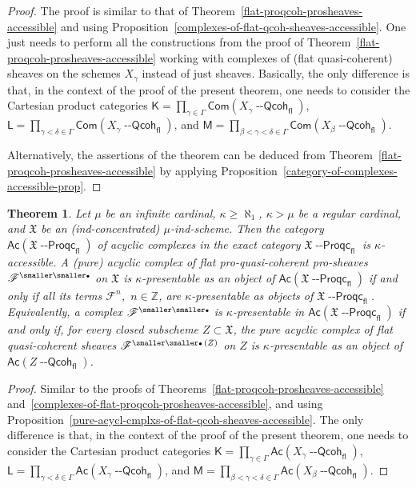 \documentclass[12pt,a4paper]{amsart}
\newcommand{\+}{\protect\nobreakdash-}
\renewcommand{\:}{\colon}
\newcommand{\bu}{{\text{\smaller\smaller$\scriptstyle\bullet$}}}
\newcommand{\Qcoh}{{\operatorname{\mathsf{--Qcoh}}}}
\newcommand{\Proqc}{{\operatorname{\mathsf{--Proqc}}}}
\newcommand{\fl}{\mathsf{fl}}
\newcommand{\Com}{\mathsf{Com}}
\newcommand{\Ac}{\mathsf{Ac}}
\newcommand{\sK}{\mathsf K}
\newcommand{\sL}{\mathsf L}
\newcommand{\sM}{\mathsf M}
\newcommand{\fX}{\mathfrak X}
\newcommand{\rF}{\mathscr F}
\newcommand{\boZ}{\mathbb Z}
\theoremstyle{plain}
\newtheorem{thm}{Theorem}[section]
\theoremstyle{definition}
\begin{document}
\begin{proof}
 The proof is similar to that of
Theorem~\ref{flat-proqcoh-prosheaves-accessible} and using
Proposition~\ref{complexes-of-flat-qcoh-sheaves-accessible}.
 One just needs to perform all the constructions from the proof of
Theorem~\ref{flat-proqcoh-prosheaves-accessible} working with
complexes of (flat quasi-coherent) sheaves on the schemes $X_\gamma$
instead of just sheaves.
 Basically, the only difference is that, in the context of the proof
of the present theorem, one needs to consider the Cartesian product
categories $\sK=\prod_{\gamma\in\Gamma}\Com(X_\gamma\Qcoh_\fl)$, \
$\sL=\prod_{\gamma<\delta\in\Gamma}\Com(X_\gamma\Qcoh_\fl)$, and
$\sM=\prod_{\beta<\gamma<\delta\in\Gamma}\Com(X_\beta\Qcoh_\fl)$.

 Alternatively, the assertions of the theorem can be deduced from
Theorem~\ref{flat-proqcoh-prosheaves-accessible} by applying
Proposition~\ref{category-of-complexes-accessible-prop}.
\end{proof}

\begin{thm} \label{purac-cmplxs-of-flat-proqcoh-prosheaves-accessible}
 Let\/ $\mu$ be an infinite cardinal, $\kappa\ge\aleph_1$, $\kappa>\mu$
be a regular cardinal, and\/ $\fX$ be an (ind-concentrated)
$\mu$\+ind-scheme.
 Then the category\/ $\Ac(\fX\Proqc_\fl)$ of acyclic complexes in 
the exact category\/ $\fX\Proqc_\fl$ is\/ $\kappa$\+accessible.
 A (pure) acyclic complex of flat pro-quasi-coherent pro-sheaves\/
$\rF^\bu$ on\/ $\fX$ is\/ $\kappa$\+presentable as an object of\/
$\Ac(\fX\Proqc_\fl)$ if and only if all its terms\/ $\rF^n$,
\,$n\in\boZ$, are\/ $\kappa$\+presentable as objects of\/
$\fX\Proqc_\fl$.
 Equivalently, a complex\/ $\rF^\bu$ is\/ $\kappa$\+presentable in\/
$\Ac(\fX\Proqc_\fl)$ if and only if, for every closed subscheme
$Z\subset\fX$, the pure acyclic complex of flat quasi-coherent sheaves
$\rF^{\bu\,(Z)}$ on $Z$ is\/ $\kappa$\+presentable as an object of\/
$\Ac(Z\Qcoh_\fl)$.
\end{thm}

\begin{proof}
 Similar to the proofs of
Theorems~\ref{flat-proqcoh-prosheaves-accessible}
and~\ref{complexes-of-flat-proqcoh-prosheaves-accessible}, and using
Proposition~\ref{pure-acycl-cmplxs-of-flat-qcoh-sheaves-accessible}.
 The only difference is that, in the context of the proof
of the present theorem, one needs to consider the Cartesian product
categories $\sK=\prod_{\gamma\in\Gamma}\Ac(X_\gamma\Qcoh_\fl)$, \
$\sL=\prod_{\gamma<\delta\in\Gamma}\Ac(X_\gamma\Qcoh_\fl)$, and
$\sM=\prod_{\beta<\gamma<\delta\in\Gamma}\Ac(X_\beta\Qcoh_\fl)$.
\end{proof}
\end{document}
